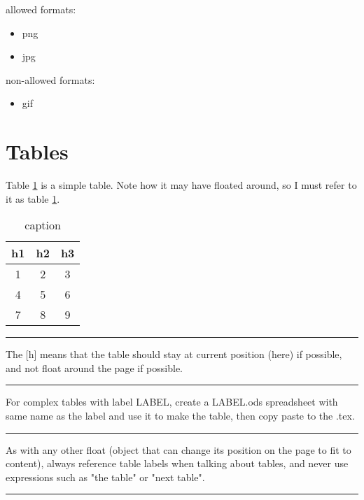 \documentclass[12pt]{article}
\newcommand{\inOut}[1]{#1} %
\begin{document}
allowed formats:
\begin{itemize}
  \item png
  \item jpg
\end{itemize}

non-allowed formats:
\begin{itemize}
  \item gif
\end{itemize}

\section{Tables}\label{secTab}

\begin{example} \label{expTab1}
	Table \ref{tab1} is a simple table. Note how it may have floated around, so I must refer to it as table \ref{tab1}.
	\inOut{
		\begin{table}[h]
		  \centering
		  \begin{tabular}{ccc}
        h1 & h2 & h3 \\  		    
		    \hline
		    1 & 2 & 3 \\
		    4 & 5 & 6 \\
		    7 & 8 & 9 \\
		  \end{tabular}
		  \caption{caption}
		  \label{tab1}
		\end{table}
	}
\end{example}\hrule

\begin{remark} \label{remTab1}
  The [h] means that the table should stay at current position (here) if possible, and not float around the page if possible.
\end{remark}\hrule

\begin{remark} \label{remTab2}
  For complex tables with label LABEL, create a LABEL.ods spreadsheet with same name as the label and use it to make the table, then copy paste to the .tex.
\end{remark}\hrule

\begin{remark} \label{remTab3}
  As with any other float (object that can change its position on the page to fit to content), always reference table labels when talking about tables, and never use expressions such as "the table" or "next table".
\end{remark}\hrule
\end{document}
